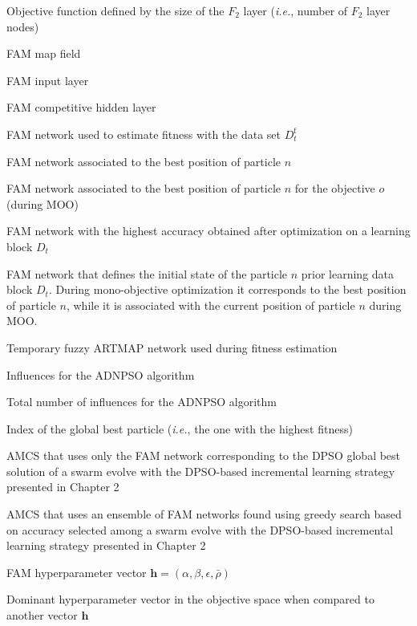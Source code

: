 \item [$f_s(\mathbf{h},t)$] Objective function defined by the size of the $F_2$ layer (\emph{i.e.}, number of $F_2$ layer nodes)
\item [$F^{ab}$] FAM map field
\item [$F_1$] FAM input layer
\item [$F_2$] FAM competitive hidden layer
\item [$\textit{FAM}_\text{estimation}$] FAM network used to estimate fitness with the data set $D_t^\text{f}$
\item [$\textit{FAM}_n$] FAM network associated to the best position of particle $n$
\item [$\textit{FAM}_{n,o}$] FAM network associated to the best position of particle $n$ for the objective $o$ (during MOO)
\item [$\textit{FAM}_\text{optimal}$] FAM network with the highest accuracy obtained after optimization on a learning block $D_t$
\item [$\textit{FAM}_n^\text{start}$] FAM network that defines the initial state of the particle $n$ prior learning data block $D_t$. During mono-objective optimization it corresponds to the best position of particle $n$, while it is associated with the current position of particle $n$ during MOO.
\item [$\textit{FAM}_\text{temp}$] Temporary fuzzy ARTMAP network used during fitness estimation
\item [$\phi$] Influences for the ADNPSO algorithm
\item [$\Phi$] Total number of influences for the ADNPSO algorithm
\item [$gbest$] Index of the global best particle (\emph{i.e.}, the one with the highest fitness)
\item [GBEST] AMCS that uses only the FAM network corresponding to the DPSO global best solution of a swarm evolve with the DPSO-based incremental learning strategy presented in Chapter 2
\item [GREEDY$_\text{a}$] AMCS that uses an ensemble of FAM networks found using greedy search based on accuracy selected among a swarm evolve with the DPSO-based incremental learning strategy presented in Chapter 2
\item [$\textbf{h}$] FAM hyperparameter vector $\textbf{h} = (\alpha, \beta, \epsilon, \bar{\rho})$
\item [$\textbf{h}^d$] Dominant hyperparameter vector in the objective space when compared to another vector $\textbf{h}$
